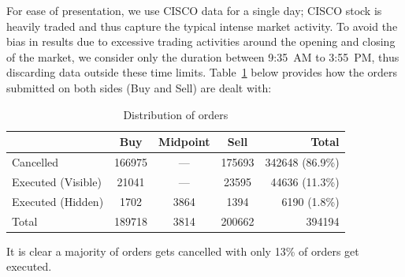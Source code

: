 For ease of presentation, we use CISCO data for a single day; CISCO stock is heavily traded and thus capture the typical intense market activity. To avoid the bias in results due to excessive trading activities around the opening and closing of the market, we consider only the duration between 9:35~AM to 3:55~PM, thus discarding data outside these time limits. Table~\ref{tab:distributionoforder} below provides how the orders submitted on both sides (Buy and Sell) are dealt with:
	\begin{table}[!ht]
	\centering
	\caption{Distribution of orders \label{tab:distributionoforder}}
	\begin{tabular}{l | ccc | r}
	& Buy & Midpoint & Sell & Total \\ \hline
	Cancelled & 166975 & --- & 175693 & 342648 (86.9\%) \\
	Executed (Visible) & 21041 & --- & 23595 & 44636 (11.3\%) \\
	Executed (Hidden) & 1702 & 3864 & 1394 & 6190 (1.8\%) \\ \hline
	Total & 189718 & 3814 & 200662 & 394194
	\end{tabular}
	\end{table}
It is clear a majority of orders gets cancelled with only 13\% of orders get executed. 


